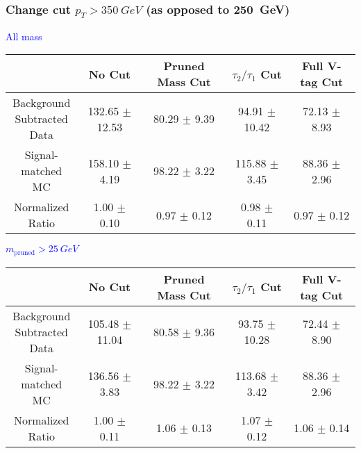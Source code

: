 \documentclass{beamer}
\newcommand{\backupend}{
  \addtocounter{framenumbervorappendix}{-\value{framenumber}}
  \addtocounter{framenumber}{\value{framenumbervorappendix}} 
}
\begin{document}
\begin{frame}
  \frametitle{Change cut $p_T > \SI{350}{GeV}$ (as opposed to \SI{250}{GeV})}
  \begin{adjustwidth}{-1.5em}{-1.5em}
    \centering
    \vspace{6pt}
    \textcolor{blue}{All mass}
    \vspace{6pt}

    {\scriptsize
      \begin{tabular}{c | c | c | c | c}
        \hline
        & No Cut & Pruned Mass Cut & $\tau_2/\tau_1$ Cut & Full V-tag Cut \\
        \hline
        \makecell{Background \\ Subtracted \\ Data} & 132.65 $\pm$ 12.53 & 80.29 $\pm$ 9.39 & 94.91 $\pm$ 10.42 & 72.13 $\pm$ 8.93 \\
        \makecell{Signal-\\ matched MC} & 158.10 $\pm$ 4.19 & 98.22 $\pm$ 3.22 & 115.88 $\pm$ 3.45 & 88.36 $\pm$ 2.96 \\
        \hline
        \makecell{Normalized \\ Ratio} & 1.00 $\pm$ 0.10 & 0.97 $\pm$ 0.12 & 0.98 $\pm$ 0.11 & 0.97 $\pm$ 0.12 \\
        \hline
      \end{tabular}
    }

    \vspace{6pt}
    \textcolor{blue}{$m_\text{pruned} > \SI{25}{GeV}$}
    \vspace{6pt}

    {\scriptsize
      \begin{tabular}{c | c | c | c | c}
        \hline
        & No Cut & Pruned Mass Cut & $\tau_2/\tau_1$ Cut & Full V-tag Cut \\
        \hline
        \makecell{Background \\ Subtracted \\ Data} & 105.48 $\pm$ 11.04 & 80.58 $\pm$ 9.36 & 93.75 $\pm$ 10.28 & 72.44 $\pm$ 8.90 \\
        \makecell{Signal-\\ matched MC} & 136.56 $\pm$ 3.83 & 98.22 $\pm$ 3.22 & 113.68 $\pm$ 3.42 & 88.36 $\pm$ 2.96 \\
        \hline
        \makecell{Normalized \\ Ratio} & 1.00 $\pm$ 0.11 & 1.06 $\pm$ 0.13 & 1.07 $\pm$ 0.12 & 1.06 $\pm$ 0.14 \\
        \hline
      \end{tabular}
    }
  \end{adjustwidth}
\end{frame}



\backupend
\end{document}
